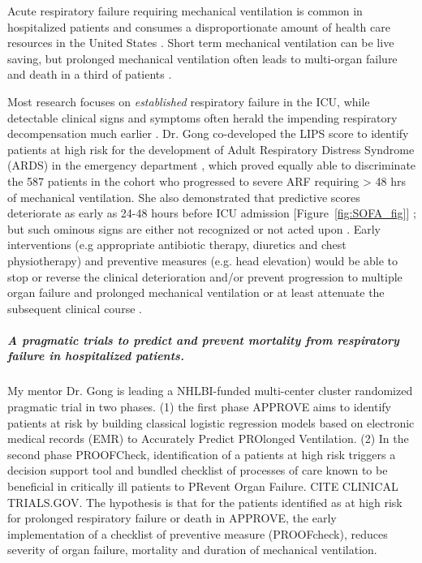 \documentclass[11pt,notitlepage]{article}
\begin{document}
Acute respiratory failure requiring mechanical ventilation is common in hospitalized patients and consumes a disproportionate amount of health care resources in the United States \cite{Wunsch_20639743}. Short term mechanical ventilation can be live saving, but prolonged mechanical ventilation often leads to multi-organ failure and death in a third of patients \cite{Wunsch_20639743, Ranieri_10872010}.

Most research focuses on \textit{established} respiratory failure in the ICU, while detectable clinical signs and symptoms often herald the impending respiratory decompensation much earlier \cite{Rohde_23401431}. Dr. Gong co-developed the LIPS score to identify patients at high risk for the development of Adult Respiratory Distress Syndrome (ARDS) in the emergency department \cite{Herridge_12594312}, which proved equally able to discriminate the 587 patients in the cohort who progressed to severe ARF requiring > 48 hrs of mechanical ventilation. She also demonstrated that predictive scores deteriorate as early as 24-48 hours before ICU admission  [Figure~\ref{fig:SOFA_fig}] \cite{Yu_24970344}; but such ominous signs are either not recognized or not acted upon \cite{Hillman_12415452,McQuillan_9632403}. Early interventions (e.g appropriate antibiotic therapy, diuretics and chest physiotherapy) and preventive measures (e.g. head elevation) would be able to stop or reverse the clinical deterioration and/or prevent progression to multiple organ failure and prolonged mechanical ventilation or at least attenuate the subsequent clinical course \cite{Naeem_16150531,Rivers_11794169,Rivers_12594312,Mitchell_20378235}. 

\subparagraph{A pragmatic trials to predict and prevent mortality from respiratory failure in hospitalized patients.}  My mentor Dr. Gong is leading a NHLBI-funded multi-center cluster randomized pragmatic trial in two phases. (1) the first phase APPROVE aims to identify patients at risk by building classical logistic regression models based on electronic medical records (EMR) to Accurately Predict PROlonged Ventilation. (2) In the second phase PROOFCheck, identification of a patients at high risk triggers a decision support tool and bundled checklist of processes of care known to be beneficial in critically ill patients to PRevent Organ Failure. CITE CLINICAL TRIALS.GOV. The hypothesis is that for the patients identified as at high risk for prolonged respiratory failure or death in APPROVE, the early implementation of a checklist of preventive measure (PROOFcheck), reduces severity of organ failure, mortality and duration of mechanical ventilation. 
\end{document}

